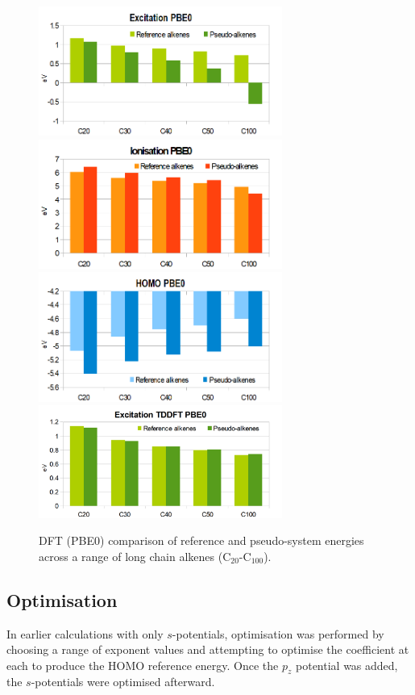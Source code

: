 \documentclass[journal=jctcce,manuscript=article]{achemso}
\begin{document}
\begin{figure}[h]
\includegraphics[width=8cm]{pbe0_excitation_long}
\includegraphics[width=8cm]{pbe0_ionisation_long}
\includegraphics[width=8cm]{pbe0_homo_long}
\includegraphics[width=8cm]{tddft_excitation_long}
\caption{DFT (PBE0) comparison of reference and pseudo-system energies across a range of long chain alkenes (C\(_{20}\)-C\(_{100}\)).}
\label{fig:rings_graphs}
\end{figure}

\subsection{Optimisation}

In earlier calculations with only \(s\)-potentials, optimisation was performed by choosing a range of exponent values and attempting to optimise the coefficient at each to produce the HOMO reference energy. Once the \(p_{z}\) potential was added, the \(s\)-potentials were optimised afterward. 
\end{document}
